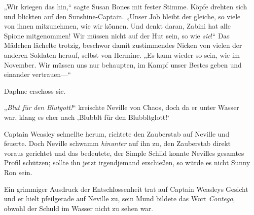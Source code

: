 „Wir kriegen das hin,“ sagte Susan Bones mit fester Stimme. Köpfe drehten sich und blickten auf den Sunshine-Captain. „Unser Job bleibt der gleiche, so viele von ihnen mitzunehmen, wie wir können. Und denkt daran, Zabini hat alle Spione mitgenommen! Wir müssen nicht auf der Hut sein, so wie \emph{sie}!“ Das Mädchen lächelte trotzig, beschwor damit zustimmendes Nicken von vielen der anderen Soldaten herauf, selbst von Hermine. „Es kann wieder so sein, wie im November. Wir müssen uns nur behaupten, im Kampf unser Bestes geben und einander vertrauen—“

Daphne erschoss sie.

\later

„\emph{Blut für den Blutgott!}“ kreischte Neville von Chaos, doch da er unter Wasser war, klang es eher nach ‚Blubblt für den Blubbltglott!‘

Captain Weasley schnellte herum, richtete den Zauberstab auf Neville und feuerte. Doch Neville schwamm \emph{hinunter} auf ihn zu, den Zauberstab direkt voraus gerichtet und das bedeutete, der Simple Schild konnte Nevilles gesamtes Profil schützen; sollte ihn jetzt irgendjemand erschießen, so würde es nicht Sunny Ron sein.

Ein grimmiger Ausdruck der Entschlossenheit trat auf Captain Weasleys Gesicht und er hielt pfeilgerade auf Neville zu, sein Mund bildete das Wort \emph{Contego}, obwohl der Schuld im Wasser nicht zu sehen war.

